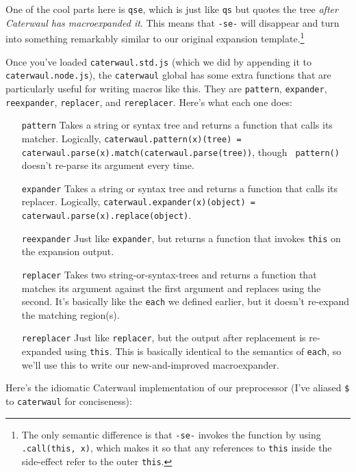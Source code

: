 \documentclass{report}
\begin{document}
    One of the cool parts here is {\tt qse}, which is just like {\tt qs} but quotes the tree {\em after Caterwaul has macroexpanded it}. This means that {\tt -se-} will disappear and turn into
    something remarkably similar to our original expansion template.\footnote{The only semantic difference is that {\tt -se-} invokes the function by using {\tt .call(this, x)}, which makes it
    so that any references to {\tt this} inside the side-effect refer to the outer {\tt this}.}

    Once you've loaded {\tt caterwaul.std.js} (which we did by appending it to {\tt caterwaul.node.js}), the {\tt caterwaul} global has some extra functions that are particularly useful for
    writing macros like this. They are {\tt pattern}, {\tt expander}, {\tt reexpander}, {\tt replacer}, and {\tt rereplacer}. Here's what each one does:

\begin{enumerate}
\item[{\tt pattern}]
  Takes a string or syntax tree and returns a function that calls its matcher. Logically, {\tt caterwaul.pattern(x)(tree) = caterwaul.parse(x).match(caterwaul.parse(tree))}, though {\tt
  pattern()} doesn't re-parse its argument every time.

\item[{\tt expander}]
  Takes a string or syntax tree and returns a function that calls its replacer. Logically, {\tt caterwaul.expander(x)(object) = caterwaul.parse(x).replace(object)}.

\item[{\tt reexpander}]
  Just like {\tt expander}, but returns a function that invokes {\tt this} on the expansion output.

\item[{\tt replacer}]
  Takes two string-or-syntax-trees and returns a function that matches its argument against the first argument and replaces using the second. It's basically like the {\tt each} we
  defined earlier, but it doesn't re-expand the matching region(s).

\item[{\tt rereplacer}]
  Just like {\tt replacer}, but the output after replacement is re-expanded using {\tt this}. This is basically identical to the semantics of {\tt each}, so we'll use this to write our
  new-and-improved macroexpander.
\end{enumerate}

    Here's the idiomatic Caterwaul implementation of our preprocessor (I've aliased \verb|$| to {\tt caterwaul} for conciseness):
\end{document}
